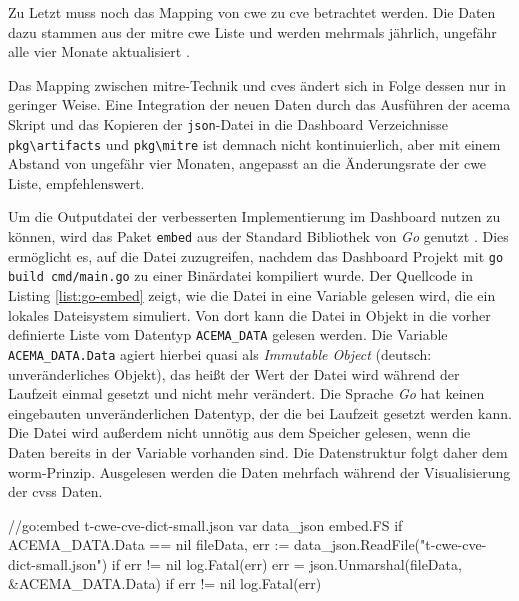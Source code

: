 Zu Letzt muss noch das Mapping von \gls{cwe} zu \gls{cve} betrachtet werden. Die Daten dazu stammen aus der \gls{mitre} \gls{cwe} Liste und werden mehrmals jährlich, ungefähr alle vier Monate aktualisiert \autocite{CWEDownloads} \autocite{AIWorkingGroupMeeting_slides20241115_CWEAIWGpdf}.

Das Mapping zwischen \gls{mitre}-Technik und \glspl{cve} ändert sich in Folge dessen nur in geringer Weise. Eine Integration der neuen Daten durch das Ausführen der \gls{acema} Skript und das Kopieren der \verb|json|-Datei in die Dashboard Verzeichnisse \verb|pkg\artifacts| und \verb|pkg\mitre| ist demnach nicht kontinuierlich, aber mit einem Abstand von ungefähr vier Monaten, angepasst an die Änderungsrate der \gls{cwe} Liste, empfehlenswert.

Um die Outputdatei der verbesserten Implementierung im Dashboard nutzen zu können, wird das Paket \verb|embed| aus der Standard Bibliothek von \textit{Go} genutzt \autocite{EmbedPackageEmbed}. Dies ermöglicht es, auf die Datei zuzugreifen, nachdem das Dashboard Projekt mit \verb|go build cmd/main.go| zu einer Binärdatei kompiliert wurde. Der Quellcode in Listing \ref{list:go-embed} zeigt, wie die Datei in eine Variable gelesen wird, die ein lokales Dateisystem simuliert. Von dort kann die Datei in Objekt in die vorher definierte Liste vom Datentyp \verb|ACEMA_DATA| gelesen werden. Die Variable \verb|ACEMA_DATA.Data| agiert hierbei quasi als \textit{Immutable Object} (deutsch: unveränderliches Objekt), das heißt der Wert der Datei wird während der Laufzeit einmal gesetzt und nicht mehr verändert. Die Sprache \textit{Go} hat keinen eingebauten unveränderlichen Datentyp, der die bei Laufzeit gesetzt werden kann. Die Datei wird außerdem nicht unnötig aus dem Speicher gelesen, wenn die Daten bereits in der Variable vorhanden sind. Die Datenstruktur folgt daher dem \gls{worm}-Prinzip. Ausgelesen werden die Daten mehrfach während der Visualisierung der \gls{cvss} Daten.

\begin{code}[caption=Datei in Binardatei einbetten und in Struktur überführen]
    //go:embed t-cwe-cve-dict-small.json
    var data_json embed.FS
    if ACEMA_DATA.Data == nil {
        fileData, err := data_json.ReadFile("t-cwe-cve-dict-small.json")
        if err != nil {
            log.Fatal(err)
        }
        err = json.Unmarshal(fileData, &ACEMA_DATA.Data)
        if err != nil {
            log.Fatal(err)
        }
    }
\end{code}
\label{list:go-embed}

